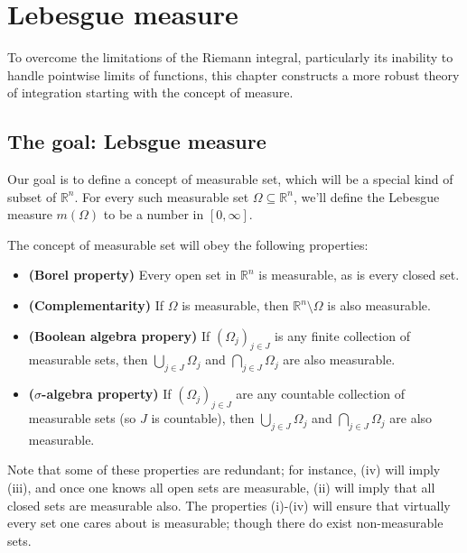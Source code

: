 \chapter{Lebesgue measure}
To overcome the limitations of the Riemann integral, particularly its inability to handle pointwise limits of functions, this chapter constructs a more robust theory of integration starting with the concept of measure.

\section{The goal: Lebsgue measure}

Our goal is to define a concept of measurable set, which will be a special kind of subset of \(\mathbb{R} ^n\). For every such measurable set \(\Omega \subseteq \mathbb{R} ^n\), we'll define the Lebesgue measure \(m(\Omega )\) to be a number in \([0, \infty]\).
\begin{definition}
    The concept of measurable set will obey the following properties:
    \begin{itemize}
        \item [(i)] \textbf{(Borel property)} Every open set in \(\mathbb{R} ^n\) is measurable, as is every closed set. 
        \item [(ii)] \textbf{(Complementarity)} If \(\Omega \) is measurable, then \(\mathbb{R} ^n \setminus \Omega \) is also measurable.
        \item [(iii)] \textbf{(Boolean algebra propery)} If \((\Omega_j )_{j \in J}\) is any finite collection of measurable sets, then \(\bigcup_{j \in J} \Omega _j \) and \(\bigcap_{j \in J} \Omega _j \) are also measurable. 
        \item [(iv)] \textbf{(\(\sigma \)-algebra property)} If \((\Omega _j)_{j \in J}\) are any countable collection of measurable sets (so \(J\) is countable), then \(\bigcup_{j \in J} \Omega _j \) and \(\bigcap_{j \in J} \Omega _j \) are also measurable.       
    \end{itemize}
\end{definition}

Note that some of these properties are redundant; for instance, (iv) will imply (iii), and once one knows all open sets are measurable, (ii) will imply that all closed sets are measurable also. The properties (i)-(iv) will ensure that virtually every set one cares about is measurable; though there do exist non-measurable sets.

